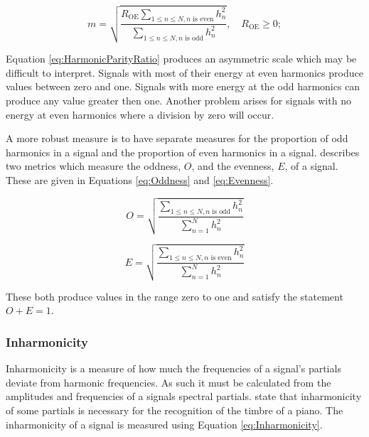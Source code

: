 			\begin{equation}
				m = \sqrt{\frac{R_{\textrm{OE}}\sum_{1 \leq n \leq N, n \textrm{ is even}} h_{n}^{2}}
					       {\sum_{1 \leq n \leq N, n \textrm{ is odd}} h_{n}^{2}}},
					       \quad R_{\textrm{OE}} \geq 0;
			       \label{eq:HarmonicParityRatioManipulation}
			\end{equation}

			Equation \ref{eq:HarmonicParityRatio} produces an asymmetric scale which may be difficult to
			interpret.  Signals with most of their energy at even harmonics produce values between zero and one.
			Signals with more energy at the odd harmonics can produce any value greater then one. Another
			problem arises for signals with no energy at even harmonics where a division by zero will occur.

			A more robust measure is to have separate measures for the proportion of odd harmonics in a signal
			and the proportion of even harmonics in a signal. \citet{lukasik2005towards} describes two metrics
			which measure the oddness, $O$, and the evenness, $E$, of a signal. These are given in Equations
			\ref{eq:Oddness} and \ref{eq:Evenness}.

			\begin{equation}
				O = \sqrt{\frac{\sum_{1 \leq n \leq N, n \textrm{ is odd}} h_{n}^{2}}
					       {\sum_{n = 1}^{N} h_{n}^{2}}}
				\label{eq:Oddness}
			\end{equation}

			\begin{equation}
				E = \sqrt{\frac{\sum_{1 \leq n \leq N, n \textrm{ is even}} h_{n}^{2}}
					       {\sum_{n = 1}^{N} h_{n}^{2}}}
				\label{eq:Evenness}
			\end{equation}

			These both produce values in the range zero to one and satisfy the statement $O + E = 1$. 

		\subsubsection*{Inharmonicity}
			Inharmonicity is a measure of how much the frequencies of a signal's partials deviate from harmonic
			frequencies. As such it must be calculated from the amplitudes and frequencies of a signals spectral
			partials. \citet{fletcher1962quality} state that inharmonicity of some partials is necessary for the
			recognition of the timbre of a piano. The inharmonicity of a signal is measured using Equation
			\ref{eq:Inharmonicity}.
			
